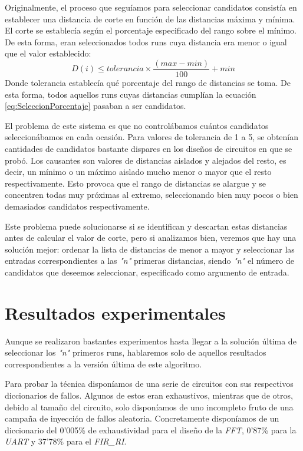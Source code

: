 Originalmente, el proceso que seguíamos para seleccionar candidatos consistía en
establecer una distancia de corte en función de las distancias máxima y mínima. El
corte se establecía según el porcentaje especificado del rango sobre el mínimo. De
esta forma, eran seleccionados todos runs cuya distancia era menor o igual que el
valor establecido:
\begin{equation}
    \label{eq:SeleccionPorcentaje}
    D(i) \leq tolerancia \times \frac{(max - min)}{100} + min
\end{equation}
Donde tolerancia establecía qué porcentaje del rango de distancias se toma. De 
esta forma, todos aquellos runs cuyas distancias cumplían la ecuación
\ref{eq:SeleccionPorcentaje} pasaban a ser candidatos.

El problema de este sistema es que no controlábamos cuántos candidatos
seleccionábamos en cada ocasión. Para valores de tolerancia de 1 a 5, se obtenían
cantidades de candidatos bastante dispares en los diseños de circuitos en que se
probó. Los causantes son valores de distancias aislados y alejados del resto, es
decir, un mínimo o un máximo aislado mucho menor o mayor que el resto
respectivamente. Esto provoca que el rango de distancias se alargue y se
concentren todas muy próximas al extremo, seleccionando bien muy pocos o bien
demasiados candidatos respectivamente.

Este problema puede solucionarse si se identifican y descartan estas distancias
antes de calcular el valor de corte, pero si analizamos bien, veremos que hay una 
solución mejor: ordenar la lista de distancias de menor a mayor y seleccionar las 
entradas correspondientes a las \textit{"n"} primeras distancias, siendo 
\textit{"n"} el número de candidatos que deseemos seleccionar, especificado como 
argumento de entrada.

\section{Resultados experimentales}
\label{sec:LevenResults}
Aunque se realizaron bastantes experimentos hasta llegar a la solución última de
seleccionar los \textit{"n"} primeros runs, hablaremos solo de aquellos resultados
correspondientes a la versión última de este algoritmo.

Para probar la técnica disponíamos de una serie de circuitos con sus respectivos
diccionarios de fallos. Algunos de estos eran exhaustivos, mientras que de otros,
debido al tamaño del circuito, solo disponíamos de uno incompleto fruto de una
campaña de inyección de fallos aleatoria. Concretamente disponíamos de un
diccionario del 0'005\% de exhaustividad para el diseño de la \textit{FFT}, 0'87\%
para la \textit{UART} y 37'78\% para el \textit{FIR\_RI}.

